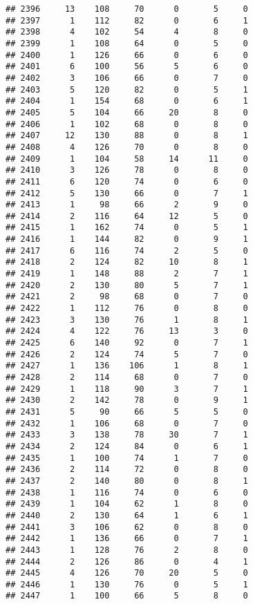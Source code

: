 \documentclass[
]{article}
\begin{document}
\begin{verbatim}
## 2396     13    108     70      0       5     0
## 2397      1    112     82      0       6     1
## 2398      4    102     54      4       8     0
## 2399      1    108     64      0       5     0
## 2400      1    126     66      0       6     0
## 2401      6    100     56      5       6     0
## 2402      3    106     66      0       7     0
## 2403      5    120     82      0       5     1
## 2404      1    154     68      0       6     1
## 2405      5    104     66     20       8     0
## 2406      1    102     68      0       8     0
## 2407     12    130     88      0       8     1
## 2408      4    126     70      0       8     0
## 2409      1    104     58     14      11     0
## 2410      3    126     78      0       8     0
## 2411      6    120     74      0       6     0
## 2412      5    130     66      0       7     1
## 2413      1     98     66      2       9     0
## 2414      2    116     64     12       5     0
## 2415      1    162     74      0       5     1
## 2416      1    144     82      0       9     1
## 2417      6    116     74      2       5     0
## 2418      2    124     82     10       8     1
## 2419      1    148     88      2       7     1
## 2420      2    130     80      5       7     1
## 2421      2     98     68      0       7     0
## 2422      1    112     76      0       8     0
## 2423      3    130     76      1       8     1
## 2424      4    122     76     13       3     0
## 2425      6    140     92      0       7     1
## 2426      2    124     74      5       7     0
## 2427      1    136    106      1       8     1
## 2428      2    114     68      0       7     0
## 2429      1    118     90      3       7     1
## 2430      2    142     78      0       9     1
## 2431      5     90     66      5       5     0
## 2432      1    106     68      0       7     0
## 2433      3    138     78     30       7     1
## 2434      2    124     84      0       6     1
## 2435      1    100     74      1       7     0
## 2436      2    114     72      0       8     0
## 2437      2    140     80      0       8     1
## 2438      1    116     74      0       6     0
## 2439      1    104     62      1       8     0
## 2440      2    130     64      1       6     1
## 2441      3    106     62      0       8     0
## 2442      1    136     66      0       7     1
## 2443      1    128     76      2       8     0
## 2444      2    126     86      0       4     1
## 2445      4    126     70     20       5     0
## 2446      1    130     76      0       5     1
## 2447      1    100     66      5       8     0

\end{verbatim}
\end{document}
